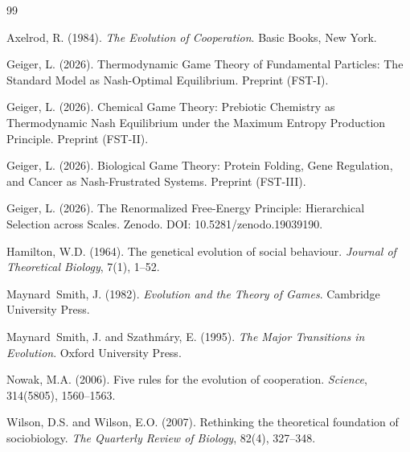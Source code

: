 \documentclass[12pt,a4paper]{article}
\theoremstyle{remark}
\begin{document}
\newpage
\begin{thebibliography}{99}

  Axelrod, R. (1984).
  \textit{The Evolution of Cooperation}.
  Basic Books, New York.

  Geiger, L. (2026).
  Thermodynamic Game Theory of Fundamental Particles: The Standard Model as Nash-Optimal Equilibrium.
  Preprint (FST-I).

  Geiger, L. (2026).
  Chemical Game Theory: Prebiotic Chemistry as Thermodynamic Nash Equilibrium under the Maximum Entropy Production Principle.
  Preprint (FST-II).

  Geiger, L. (2026).
  Biological Game Theory: Protein Folding, Gene Regulation, and Cancer as Nash-Frustrated Systems.
  Preprint (FST-III).

  Geiger, L. (2026).
  The Renormalized Free-Energy Principle: Hierarchical Selection across Scales.
  Zenodo. DOI: 10.5281/zenodo.19039190.

  Hamilton, W.D. (1964).
  The genetical evolution of social behaviour.
  \textit{Journal of Theoretical Biology}, 7(1), 1--52.

  Maynard~Smith, J. (1982).
  \textit{Evolution and the Theory of Games}.
  Cambridge University Press.

  Maynard~Smith, J. and Szathm{\'a}ry, E. (1995).
  \textit{The Major Transitions in Evolution}.
  Oxford University Press.

  Nowak, M.A. (2006).
  Five rules for the evolution of cooperation.
  \textit{Science}, 314(5805), 1560--1563.

  Wilson, D.S. and Wilson, E.O. (2007).
  Rethinking the theoretical foundation of sociobiology.
  \textit{The Quarterly Review of Biology}, 82(4), 327--348.

\end{thebibliography}

\end{document}
